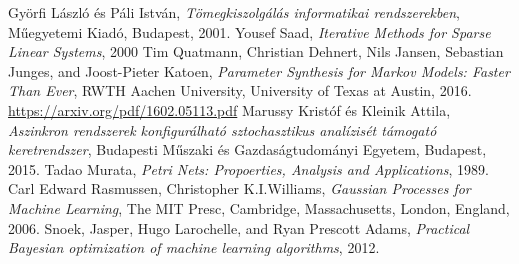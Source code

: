
\begin{thebibliography}{widestlabel}
	 Györfi László és Páli István, \textit{Tömegkiszolgálás informatikai rendszerekben}, Műegyetemi Kiadó, Budapest, 2001.
	 Yousef Saad, \textit{Iterative Methods for Sparse Linear Systems}, 2000
	 Tim Quatmann, Christian Dehnert, Nils Jansen,	Sebastian Junges, and Joost-Pieter Katoen, \textit{Parameter Synthesis for Markov Models: Faster Than Ever}, RWTH Aachen University, University of Texas at Austin, 2016. \url{https://arxiv.org/pdf/1602.05113.pdf}
	 Marussy Kristóf és Kleinik Attila,\textit{ Aszinkron rendszerek konfigurálható sztochasztikus analízisét támogató keretrendszer}, Budapesti Műszaki és Gazdaságtudományi Egyetem, Budapest, 2015.
	 Tadao Murata, \textit{Petri Nets: Propoerties, Analysis and Applications}, 1989.
	Carl Edward Rasmussen, Christopher K.I.Williams, \textit{Gaussian Processes for Machine Learning}, The MIT Presc, Cambridge, Massachusetts, London, England, 2006.
	 Snoek, Jasper, Hugo Larochelle, and Ryan Prescott Adams, 
	\textit{Practical Bayesian optimization of machine learning algorithms}, 2012.

\end{thebibliography}